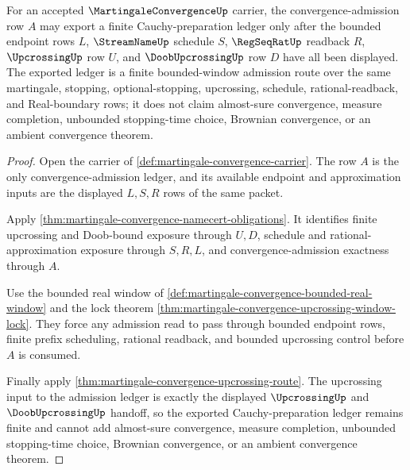 \begin{theorem}
\label{thm:martingale-convergence-finite-cauchy-admission}
For an accepted $\MartingaleConvergenceUp$ carrier, the convergence-admission row $A$ may export a finite Cauchy-preparation ledger only after the bounded endpoint rows $L$, $\StreamNameUp$ schedule $S$, $\RegSeqRatUp$ readback $R$, $\UpcrossingUp$ row $U$, and $\DoobUpcrossingUp$ row $D$ have all been displayed. The exported ledger is a finite bounded-window admission route over the same martingale, stopping, optional-stopping, upcrossing, schedule, rational-readback, and Real-boundary rows; it does not claim almost-sure convergence, measure completion, unbounded stopping-time choice, Brownian convergence, or an ambient convergence theorem.
\end{theorem}
\begin{proof}
Open the carrier of \autoref{def:martingale-convergence-carrier}. The row $A$ is the only convergence-admission ledger, and its available endpoint and approximation inputs are the displayed $L,S,R$ rows of the same packet.

Apply \autoref{thm:martingale-convergence-namecert-obligations}. It identifies finite upcrossing and Doob-bound exposure through $U,D$, schedule and rational-approximation exposure through $S,R,L$, and convergence-admission exactness through $A$.

Use the bounded real window of \autoref{def:martingale-convergence-bounded-real-window} and the lock theorem \autoref{thm:martingale-convergence-upcrossing-window-lock}. They force any admission read to pass through bounded endpoint rows, finite prefix scheduling, rational readback, and bounded upcrossing control before $A$ is consumed.

Finally apply \autoref{thm:martingale-convergence-upcrossing-route}. The upcrossing input to the admission ledger is exactly the displayed $\UpcrossingUp$ and $\DoobUpcrossingUp$ handoff, so the exported Cauchy-preparation ledger remains finite and cannot add almost-sure convergence, measure completion, unbounded stopping-time choice, Brownian convergence, or an ambient convergence theorem.
\end{proof}

